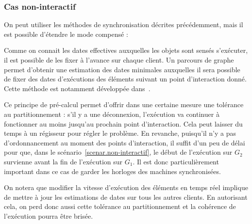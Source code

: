 \documentclass[10pt]{article}
\newcommand\trigger{point d'interaction\xspace}
\begin{document}
\begin{itemize}
    \begin{figure}[h]
        \centering
        \begin{tikzpicture}
        
        \end{tikzpicture}
        \label{scenar.twobranches}
    \end{figure}

    
\end{itemize}



\subsubsection{Cas non-interactif}
On peut utiliser les méthodes de synchronisation décrites précédemment, mais il est possible d'étendre le mode compensé : 

Comme on connait les dates effectives auxquelles les objets sont sensés s'exécuter, il est possible de les fixer à l'avance sur chaque client. 
Un parcours de graphe permet d'obtenir une estimation des dates minimales auxquelles il sera possible de fixer des dates d'exécutions des éléments suivant un point d'interaction donné. 
Cette méthode est notamment développée dans~\cite{celerier2016rethinking}.

Ce principe de pré-calcul permet d'offrir dans une certaine mesure une tolérance au partitionnement : s'il y a une déconnexion, l'exécution va continuer à fonctionner au moins jusqu'au prochain \trigger.
Cela peut laisser du temps à un régisseur pour régler le problème.
En revanche, puisqu'il n'y a pas d'ordonnancement au moment des points d'interaction, il suffit d'un peu de délai pour que, dans le scénario~\ref{scenar.non-interactif}, le début de l'exécution sur $G_2$ survienne avant la fin de l'exécution sur $G_1$. 
Il est donc particulièrement important dans ce cas de garder les horloges des machines synchronisées.

On notera que modifier la vitesse d'exécution des éléments en temps réel implique de mettre à jour les estimations de dates sur tous les autres clients. 
En autorisant cela, on perd donc aussi cette tolérance au partitionnement et la cohérence de l'exécution pourra être brisée.
\end{document}
